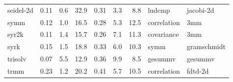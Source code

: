 \begin{tabular}{lrrrrrrll}
seidel-2d & 0.11 & 0.6 & 32.9 & 0.31 & 3.3 & 8.8 & ludcmp & jacobi-2d \\
symm & 0.12 & 1.0 & 16.5 & 0.28 & 5.3 & 12.5 & correlation & 3mm \\
syr2k & 0.11 & 1.4 & 15.7 & 0.26 & 7.1 & 11.3 & covariance & 3mm \\
syrk & 0.15 & 1.5 & 18.8 & 0.33 & 6.0 & 10.3 & symm & gramschmidt \\
trisolv & 0.07 & 5.5 & 12.9 & 0.36 & 9.9 & 8.5 & gesummv & gesummv \\
trmm & 0.23 & 1.2 & 20.2 & 0.41 & 5.7 & 10.5 & correlation & fdtd-2d \\
\bottomrule
\end{tabular}
